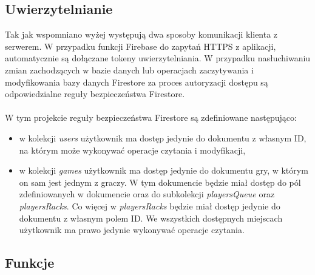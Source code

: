 \subsection{Uwierzytelnianie}

Tak jak wspomniano wyżej występują dwa sposoby komunikacji klienta z serwerem. W przypadku funkcji Firebase do zapytań HTTPS z aplikacji, automatycznie są dołączane tokeny uwierzytelniania. W przypadku nasłuchiwaniu zmian zachodzących w bazie danych lub operacjach zaczytywania i modyfikowania bazy danych Firestore za proces autoryzacji dostępu są odpowiedzialne reguły bezpieczeństwa Firestore. \\ \\
W tym projekcie reguły bezpieczeństwa Firestore są zdefiniowane następująco:
\begin{itemize}
	\item w kolekcji \emph{users} użytkownik ma dostęp jedynie do dokumentu z własnym ID, na którym może wykonywać operacje czytania i modyfikacji,
	\item w kolekcji \emph{games} użytkownik ma dostęp jedynie do dokumentu gry, w którym on sam jest jednym z graczy. W tym dokumencie będzie miał dostęp do pól zdefiniowanych w dokumencie oraz do subkolekcji \emph{playersQueue} oraz \emph{playersRacks}. Co więcej w \emph{playersRacks} będzie miał dostęp jedynie do dokumentu z własnym polem ID. We wszystkich dostępnych miejscach użytkownik ma prawo jedynie wykonywać operacje czytania.
\end{itemize}

\subsection{Funkcje}

